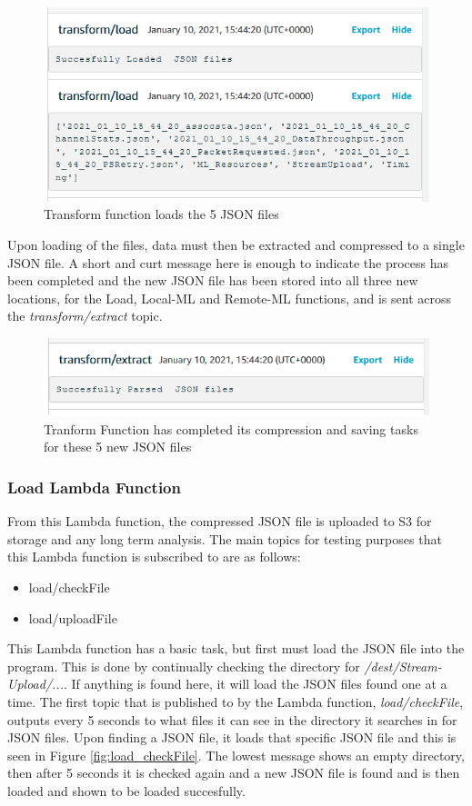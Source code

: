 \begin{figure}[ht]
    \centering
    \includegraphics[width=0.7\linewidth]{pages/Chapter5/Chapter 5 images/Lambda-Fns/transform_load.png}
    \caption{Transform function loads the 5 JSON files}
    \label{fig:transform_load}
\end{figure}

Upon loading of the files, data must then be extracted and compressed to a single JSON file. A short and curt message here is enough to indicate the process has been completed and the new JSON file has been stored into all three new locations, for the Load, Local-ML and Remote-ML functions, and is sent across the \textit{transform/extract} topic.

\begin{figure}[ht]
    \centering
    \includegraphics[width=0.5\linewidth]{pages/Chapter5/Chapter 5 images/Lambda-Fns/transform_extract.png}
    \caption{Tranform Function has completed its compression and saving tasks for these 5 new JSON files}
    \label{fig:my_label}
\end{figure}

\subsubsection{Load Lambda Function}
From this Lambda function, the compressed JSON file is uploaded to S3 for storage and any long term analysis. The main topics for testing purposes that this Lambda function is subscribed to are as follows:
\begin{itemize}
    \item load/checkFile
    \item load/uploadFile
\end{itemize}

This Lambda function has a basic task, but first must load the JSON file into the program. This is done by continually checking the directory for \textit{/dest/Stream-Upload/...}. If anything is found here, it will load the JSON files found one at a time. The first topic that is published to by the Lambda function, \textit{load/checkFile}, outputs every 5 seconds to what files it can see in the directory it searches in for JSON files. Upon finding a JSON file, it loads that specific JSON file and this is seen in Figure \ref{fig:load_checkFile}. The lowest message shows an empty directory, then after 5 seconds it is checked again and a new JSON file is found and is then loaded and shown to be loaded succesfully.



